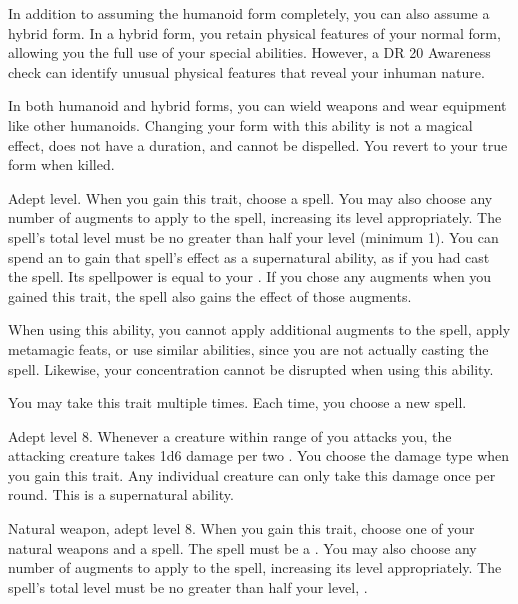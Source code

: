     In addition to assuming the humanoid form completely, you can also assume a hybrid form.
    In a hybrid form, you retain physical features of your normal form, allowing you the full use of your special abilities.
    However, a DR 20 Awareness check can identify unusual physical features that reveal your inhuman nature.

    In both humanoid and hybrid forms, you can wield weapons and wear equipment like other humanoids.
    Changing your form with this ability is not a magical effect, does not have a duration, and cannot be dispelled.
    You revert to your true form when killed.

    \featpre Adept level.
    \featben When you gain this trait, choose a spell.
    You may also choose any number of augments to apply to the spell, increasing its level appropriately.
    The spell's total level must be no greater than half your level (minimum 1).
    You can spend an  to gain that spell's effect as a supernatural ability, as if you had cast the spell.
    Its spellpower is equal to your .
    If you chose any augments when you gained this trait, the spell also gains the effect of those augments.

    When using this ability, you cannot apply additional augments to the spell, apply metamagic feats, or use similar abilities, since you are not actually casting the spell.
    Likewise, your concentration cannot be disrupted when using this ability.

     You may take this trait multiple times.
    Each time, you choose a new spell.

    \featpre Adept level 8.
    \featben Whenever a creature within \rngmed range of you attacks you, the attacking creature takes 1d6 damage per two .
    You choose the damage type when you gain this trait.
    Any individual creature can only take this damage once per round.
    This is a supernatural ability.

    \featpres Natural weapon, adept level 8.
    \featben When you gain this trait, choose one of your natural weapons and a spell.
    The spell must be a .
    You may also choose any number of augments to apply to the spell, increasing its level appropriately.
    The spell's total level must be no greater than half your level, .

